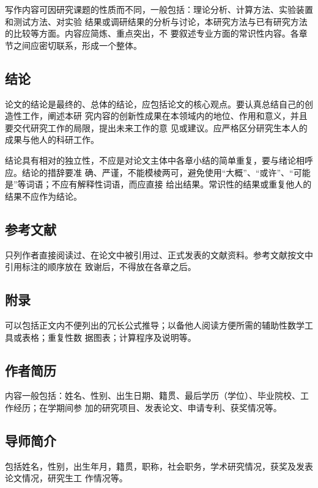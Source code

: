 写作内容可因研究课题的性质而不同，一般包括：理论分析、计算方法、实验装置和测试方法、对实验
结果或调研结果的分析与讨论，本研究方法与已有研究方法的比较等方面。内容应简炼、重点突出，不
要叙述专业方面的常识性内容。各章节之间应密切联系，形成一个整体。

\subsection{结论}
\label{sec:conclusion}

论文的结论是最终的、总体的结论，应包括论文的核心观点。要认真总结自己的创造性工作，阐述本研
究内容的创新性成果在本领域内的地位、作用和意义，并且要交代研究工作的局限，提出未来工作的意
见或建议。应严格区分研究生本人的成果与他人的科研工作。

结论具有相对的独立性，不应是对论文主体中各章小结的简单重复，要与绪论相呼应。结论的措辞要准
确、严谨，不能模棱两可，避免使用“大概”、“或许”、“可能是”等词语；不应有解释性词语，而应直接
给出结果。常识性的结果或重复他人的结果不应作为结论。

\subsection{参考文献}
\label{sec:bib}

只列作者直接阅读过、在论文中被引用过、正式发表的文献资料。参考文献按文中引用标注的顺序放在
致谢后，不得放在各章之后。

\subsection{附录}
\label{sec:app}

可以包括正文内不便列出的冗长公式推导；以备他人阅读方便所需的辅助性数学工具或表格；重复性数
据图表；计算程序及说明等。

\subsection{作者简历}
\label{sec:author}

内容一般包括：姓名、性别、出生日期、籍贯、最后学历（学位）、毕业院校、工作经历；在学期间参
加的研究项目、发表论文、申请专利、获奖情况等。

\subsection{导师简介}
\label{sec:boss}

包括姓名，性别，出生年月，籍贯，职称，社会职务，学术研究情况，获奖及发表论文情况，研究生工
作情况等。

